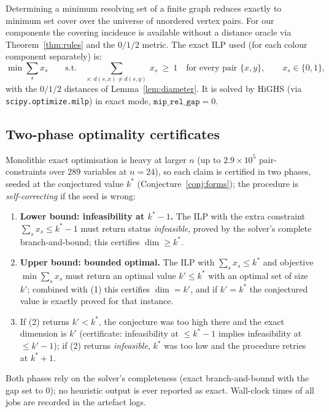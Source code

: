 \documentclass[12pt]{article}
\theoremstyle{definition}
\begin{document}
Determining a minimum resolving set of a finite graph reduces exactly to minimum set cover over the universe of unordered vertex pairs. For our components the covering incidence is available without a distance oracle via Theorem~\ref{thm:rules} and the $0/1/2$ metric. The exact ILP used (for each colour component separately) is:
\[
\min \sum_{s} x_s \qquad \text{s.t.}\quad
\sum_{s:\ d(s,x)\neq d(s,y)}\ x_s\ \ge\ 1\quad\text{for every pair }\{x,y\},\qquad x_s\in\{0,1\},
\]
with the $0/1/2$ distances of Lemma~\ref{lem:diameter}. It is solved by HiGHS (via \texttt{scipy.optimize.milp}) in exact mode, $\texttt{mip\_rel\_gap}=0$.

\subsection{Two-phase optimality certificates}

Monolithic exact optimisation is heavy at larger $n$ (up to $2.9\times10^5$ pair-constraints over $289$ variables at $n=24$), so each claim is certified in two phases, seeded at the conjectured value $k^\ast$ (Conjecture~\ref{conj:forms}); the procedure is \emph{self-correcting} if the seed is wrong:
\begin{enumerate}[label=\textup{(\arabic*)},leftmargin=6mm,itemsep=2pt]
\item \textbf{Lower bound: infeasibility at $k^\ast-1$.} The ILP with the extra constraint $\sum_s x_s\le k^\ast-1$ must return status \emph{infeasible}, proved by the solver's complete branch-and-bound; this certifies $\dim \ge k^\ast$.
\item \textbf{Upper bound: bounded optimal.} The ILP with $\sum_s x_s\le k^\ast$ and objective $\min\sum_sx_s$ must return an optimal value $k'\le k^\ast$ with an optimal set of size $k'$; combined with (1) this certifies $\dim = k'$, and if $k'=k^\ast$ the conjectured value is exactly proved for that instance.
\item If (2) returns $k'<k^\ast$, the conjecture was too high there and the exact dimension is $k'$ (certificate: infeasibility at $\le k^\ast-1$ implies infeasibility at $\le k'-1$); if (2) returns \emph{infeasible}, $k^\ast$ was too low and the procedure retries at $k^\ast+1$.
\end{enumerate}

Both phases rely on the solver's completeness (exact branch-and-bound with the gap set to $0$); no heuristic output is ever reported as exact. Wall-clock times of all jobs are recorded in the artefact logs.
\end{document}
